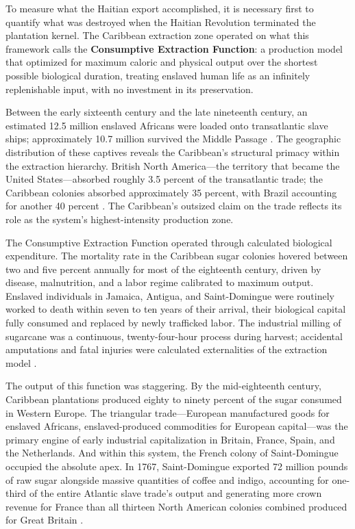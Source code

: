 To measure what the Haitian export accomplished, it is necessary first to quantify what was destroyed when the Haitian Revolution terminated the plantation kernel. The Caribbean extraction zone operated on what this framework calls the \textbf{Consumptive Extraction Function}: a production model that optimized for maximum caloric and physical output over the shortest possible biological duration, treating enslaved human life as an infinitely replenishable input, with no investment in its preservation.

Between the early sixteenth century and the late nineteenth century, an estimated 12.5 million enslaved Africans were loaded onto transatlantic slave ships; approximately 10.7 million survived the Middle Passage \cite{james_black_jacobins}. The geographic distribution of these captives reveals the Caribbean's structural primacy within the extraction hierarchy. British North America---the territory that became the United States---absorbed roughly 3.5 percent of the transatlantic trade; the Caribbean colonies absorbed approximately 35 percent, with Brazil accounting for another 40 percent \cite{james_black_jacobins}. The Caribbean's outsized claim on the trade reflects its role as the system's highest-intensity production zone.

The Consumptive Extraction Function operated through calculated biological expenditure. The mortality rate in the Caribbean sugar colonies hovered between two and five percent annually for most of the eighteenth century, driven by disease, malnutrition, and a labor regime calibrated to maximum output. Enslaved individuals in Jamaica, Antigua, and Saint-Domingue were routinely worked to death within seven to ten years of their arrival, their biological capital fully consumed and replaced by newly trafficked labor. The industrial milling of sugarcane was a continuous, twenty-four-hour process during harvest; accidental amputations and fatal injuries were calculated externalities of the extraction model \cite{james_black_jacobins}.

The output of this function was staggering. By the mid-eighteenth century, Caribbean plantations produced eighty to ninety percent of the sugar consumed in Western Europe. The triangular trade---European manufactured goods for enslaved Africans, enslaved-produced commodities for European capital---was the primary engine of early industrial capitalization in Britain, France, Spain, and the Netherlands. And within this system, the French colony of Saint-Domingue occupied the absolute apex. In 1767, Saint-Domingue exported 72 million pounds of raw sugar alongside massive quantities of coffee and indigo, accounting for one-third of the entire Atlantic slave trade's output and generating more crown revenue for France than all thirteen North American colonies combined produced for Great Britain \cite{james_black_jacobins, dubois_avengers_new_world}.

